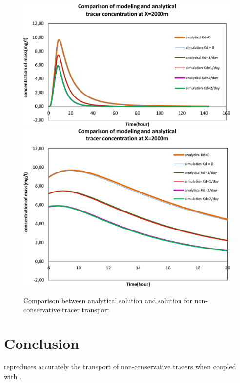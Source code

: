 \begin{figure}[H]
\centering
\includegraphics[width=.6\textwidth]{img/sol_anal}
\includegraphics[width=.6\textwidth]{img/sol_anal_zoomed}
\caption{Comparison between analytical solution and  solution for non-conservative tracer transport}\label{fig:tracer_decay:sol_anal}
\end{figure}

\section{Conclusion}
 reproduces accurately the transport of non-conservative tracers
when coupled with \waqtel.
